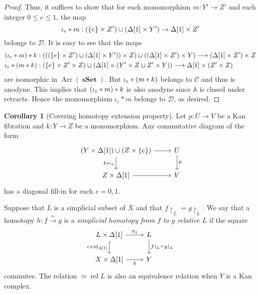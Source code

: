 \documentclass[10pt,letterpaper,cm]{nupset}
\theoremstyle{definition}
\theoremstyle{theorem}
\newtheorem{corollary}[definition]{Corollary}
\theoremstyle{remark}
\newcommand{\D}{\mathcal D}
\newcommand{\0}{\mathbf{0}}
\newcommand{\1}{\mathbf{1}}
\newcommand{\2}{\mathbf{2}}
\DeclareMathOperator{\sset}{\mathbf{sSet}}
\DeclareMathOperator{\Ar}{Arr}
\DeclareMathOperator{\idd}{id}
\DeclareMathOperator{\rel}{rel}
\begin{document}
\begin{proof}
Thus, it suffices to show that for each monomorphism $m : Y' \to Z'$ and each integer $0\leq e\leq 1$, the map $${\iota_e}\mathbin{\ast}{m} : \mleft(\mleft\{e\mright\} \times Z'\mright)\cup \mleft(\Delta[1]\times Y'\mright) \to \Delta[1]\times Z'$$ belongs to $\D$. It is easy to see that the maps
\begin{align*}
\mleft(\iota_e \mathbin{\ast}m \mright) \mathbin{\ast} k &:\mleft( \mleft(\mleft(\mleft\{e\mright\} \times Z^{\prime}\mright) \cup\mleft(\Delta[1] \times Y^{\prime}\mright)\mright) \times Z\mright) \cup \mleft(\mleft(\Delta[1] \times Z^{\prime}\mright) \times Y\mright) \longrightarrow\mleft(\Delta[1] \times Z^{\prime}\mright) \times Z
\\ 
\iota_e \mathbin{\ast} \mleft(m\mathbin{\ast}k\mright)& : \mleft(\mleft\{e\mright\} \times Z^{\prime} \times Z\mright) \cup \mleft(\Delta[1] \times\mleft(Y^{\prime} \times Z \cup Z^{\prime} \times Y\mright)\mright) \longrightarrow \Delta[1] \times\mleft(Z^{\prime} \times Z\mright)
\end{align*} are isomorphic in $\Ar(\sset)$. But $\iota_e \mathbin{\ast} \mleft(m\mathbin{\ast}k\mright)$ belongs to $\mathcal{C}$ and thus is anodyne. This implies that $\mleft(\iota_e \mathbin{\ast}m \mright) \mathbin{\ast} k$ is also anodyne since $\mathbb{A}$ is closed under retracts. Hence the monomorphism $\iota_e \mathbin{\ast}m$  belongs to $\D$, as desired.
\end{proof}


\begin{corollary}[Covering homotopy extension property]\label{chep}
Let $p : U \to V$ be a Kan fibration and $k: Y\to Z$ be a monomorphism. Any commutative diagram of the form
\[
\begin{tikzcd}
{\mleft(Y \times \Delta[1]\mright)\cup \mleft(Z\times \mleft\{e\mright\}\mright)} \arrow[d, "k\mathbin{\ast}\iota_e"'] \arrow[r] & U \arrow[d, "p"] \\
{Z\times \Delta[1]} \arrow[r]                                                                                        & V               
\end{tikzcd}
\] has a diagonal fill-in for each $e=0,1$.
\end{corollary}

\medskip


   {\bigRelbar\bigRelbar{\bigtwoarrowsleft\rightarrow\rightarrow}}

Suppose that $L$ is a simplicial subset of $X$ and that $f\restriction_L = g\restriction_L$.  We say that a homotopy $h: f\overset{\simeq}{\longrightarrow} g$ is a \textit{simplicial homotopy from $f$ to $g$ relative $L$} if the square
\[
\begin{tikzcd}
L\times \Delta[1] \arrow[r, "\pi_1"] \arrow[d, hook, "\iota\times \idd_{\Delta[1]}"'] & L \arrow[d, "f\restriction_L=g\restriction_L"] \\
X\times \Delta[1] \arrow[r, "h"']                                & Y                                             
\end{tikzcd}
\] commutes.  The relation ${}\simeq{}\rel{L}$ is also an equivalence relation when $Y$ is a Kan complex.
\end{document}
